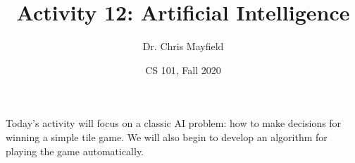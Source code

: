\documentclass[12pt]{article}
\title{Activity 12: Artificial Intelligence}
\author{Dr. Chris Mayfield}
\date{CS 101, Fall 2020}
\begin{document}
\maketitle

Today's activity will focus on a classic AI problem: how to make decisions for winning a simple tile game.
We will also begin to develop an algorithm for playing the game automatically.



\end{document}
